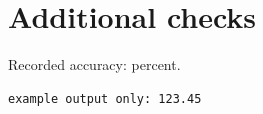 \appendix
\section{Additional checks}
Recorded accuracy:  percent.
\begin{verbatim}
example output only: 123.45
\end{verbatim}

